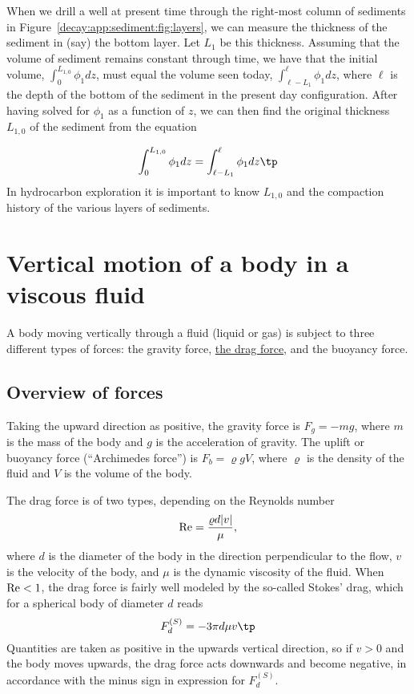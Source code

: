 \documentclass[graybox,sectrefs,envcountresetchap,open=right,final]{svmonodo}
\begin{document}
When we drill a well at present time through the right-most column of
sediments in Figure~\ref{decay:app:sediment:fig:layers}, we can measure
the thickness of the sediment in (say) the bottom layer. Let $L_1$ be
this thickness.  Assuming that the volume of sediment remains constant
through time, we have that the initial volume, $\int_0^{L_{1,0}}
\phi_1 dz$, must equal the volume seen today,
$\int_{\ell-L_1}^{\ell}\phi_1 dz$, where $\ell$ is the depth of the
bottom of the sediment in the present day configuration.  After having
solved for $\phi_1$ as a function of $z$, we can then find the
original thickness $L_{1,0}$ of the sediment from the equation

\[ \int_0^{L_{1,0}} \phi_1 dz = \int_{\ell-L_1}^{\ell}\phi_1 dz \tp \]
In hydrocarbon exploration it is important to know $L_{1,0}$ and the
compaction history of the various layers of sediments.

\section{Vertical motion of a body in a viscous fluid}
\label{decay:app:drag}


A body moving vertically through a fluid (liquid or gas) is subject to
three different types of forces: the gravity force, \href{{http://en.wikipedia.org/wiki/Drag_(physics)}}{the drag force},
and the buoyancy force.

\subsection{Overview of forces}

Taking the upward direction as positive,
the gravity force is $F_g= -mg$, where $m$ is the mass of the body and
$g$ is the acceleration of gravity.
The uplift or buoyancy force (``Archimedes force'') is $F_b = \varrho gV$,
where $\varrho$ is the density of the fluid and
$V$ is the volume of the body.

The drag force is of two types, depending on the Reynolds number
\begin{equation}
\hbox{Re} = \frac{\varrho d|v|}{\mu},
\end{equation}
where $d$ is the diameter of the body in
the direction perpendicular to the flow, $v$ is the velocity of the
body, and $\mu$ is the dynamic viscosity of the fluid.
When $\hbox{Re} < 1$, the drag force is fairly well modeled by
the so-called Stokes' drag,
which for a spherical body of diameter $d$ reads
\begin{equation}
F_d^{(S)} = - 3\pi d\mu v
\tp
\end{equation}
Quantities are taken as positive in the upwards vertical direction, so
if $v>0$ and the body moves upwards, the drag force acts downwards and
become negative, in accordance with the minus sign in expression for
$F_d^{(S)}$.
\end{document}
